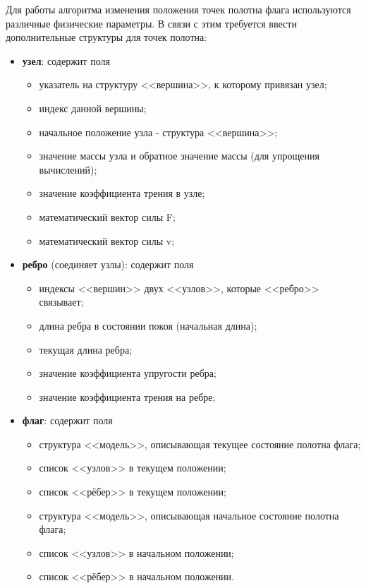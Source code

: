 \vspace{0.2cm}Для работы алгоритма изменения положения точек полотна флага используются различные физические параметры. В связи с этим требуется ввести дополнительные структуры для точек полотна:
\begin{itemize}
	\item \textbf{узел}: содержит поля
	\begin{itemize}
		\item указатель на структуру <<вершина>>, к которому привязан узел;
		\item индекс данной вершины;
		\item начальное положение узла - структура <<вершина>>;
		\item значение массы узла и обратное значение массы (для упрощения вычислений);
		\item значение коэффициента трения в узле;
		\item математический вектор силы F;
		\item математический вектор силы v;
	\end{itemize}
	\item \textbf{ребро} (соединяет узлы): содержит поля
	\begin{itemize}
		\item индексы <<вершин>> двух <<узлов>>, которые <<ребро>> связывает;
		\item длина ребра в состоянии покоя (начальная длина);
		\item текущая длина ребра;
		\item значение коэффициента упругости ребра;
		\item значение коэффициента трения на ребре;
	\end{itemize}
	\item \textbf{флаг}: содержит поля
	\begin{itemize}
		\item структура <<модель>>, описывающая текущее состояние полотна флага;
		\item список <<узлов>> в текущем положении;
		\item список <<рёбер>> в текущем положении;
		\item структура <<модель>>, описывающая начальное состояние полотна флага;
		\item список <<узлов>> в начальном положении;
		\item список <<рёбер>> в начальном положении.
	\end{itemize}
\end{itemize}

